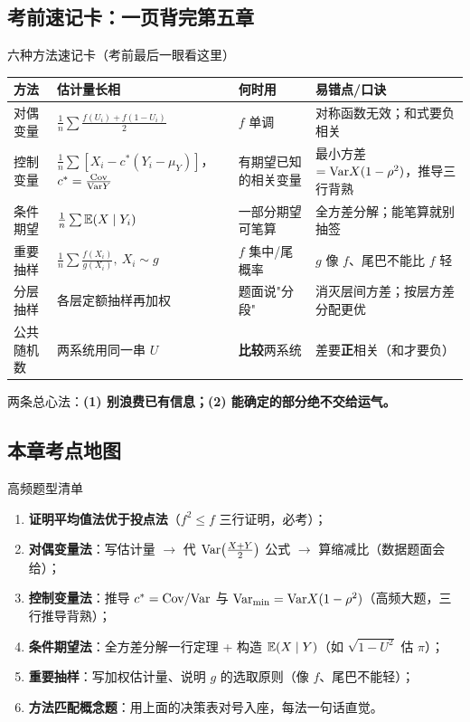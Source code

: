 \subsection{考前速记卡：一页背完第五章}

\begin{kbox}{六种方法速记卡（考前最后一眼看这里）}
\begin{center}
\renewcommand{\arraystretch}{1.6}
\begin{tabular}{|p{2.1cm}|p{4.2cm}|p{3.4cm}|p{3.6cm}|}
\hline
\textbf{方法} & \textbf{估计量长相} & \textbf{何时用} & \textbf{易错点/口诀}\\\hline
对偶变量 & $\frac1n\sum\frac{f(U_i)+f(1-U_i)}{2}$ & $f$ 单调 & 对称函数无效；和式要负相关\\\hline
控制变量 & $\frac1n\sum[X_i-c^*(Y_i-\mu_Y)]$，$c^*=\frac{\mathrm{Cov}}{\mathrm{Var} Y}$ & 有期望已知的相关变量 & 最小方差 $=\mathrm{Var} X(1-\rho^2)$，推导三行背熟\\\hline
条件期望 & $\frac1n\sum\mathbb{E}(X\mid Y_i)$ & 一部分期望可笔算 & 全方差分解；能笔算就别抽签\\\hline
重要抽样 & $\frac1n\sum\frac{f(X_i)}{g(X_i)},\ X_i\sim g$ & $f$ 集中/尾概率 & $g$ 像 $f$、尾巴不能比 $f$ 轻\\\hline
分层抽样 & 各层定额抽样再加权 & 题面说"分段" & 消灭层间方差；按层方差分配更优\\\hline
公共随机数 & 两系统用同一串 $U$ & \textbf{比较}两系统 & 差要\textbf{正}相关（和才要负）\\\hline
\end{tabular}
\end{center}
两条总心法：\textbf{(1) 别浪费已有信息；(2) 能确定的部分绝不交给运气。}
\end{kbox}

\subsection{本章考点地图}

\begin{ebox}{高频题型清单}
\begin{enumerate}[leftmargin=2em]
  \item \textbf{证明平均值法优于投点法}（$f^2\le f$ 三行证明，必考）；
  \item \textbf{对偶变量法}：写估计量 $\to$ 代 $\mathrm{Var}\big(\frac{X+Y}2\big)$ 公式 $\to$ 算缩减比（数据题面会给）；
  \item \textbf{控制变量法}：推导 $c^*=\mathrm{Cov}/\mathrm{Var}$ 与 $\mathrm{Var}_{\min}=\mathrm{Var} X(1-\rho^2)$（高频大题，三行推导背熟）；
  \item \textbf{条件期望法}：全方差分解一行定理 + 构造 $\mathbb{E}(X\mid Y)$（如 $\sqrt{1-U^2}$ 估 $\pi$）；
  \item \textbf{重要抽样}：写加权估计量、说明 $g$ 的选取原则（像 $f$、尾巴不能轻）；
  \item \textbf{方法匹配概念题}：用上面的决策表对号入座，每法一句话直觉。
\end{enumerate}
\end{ebox}
